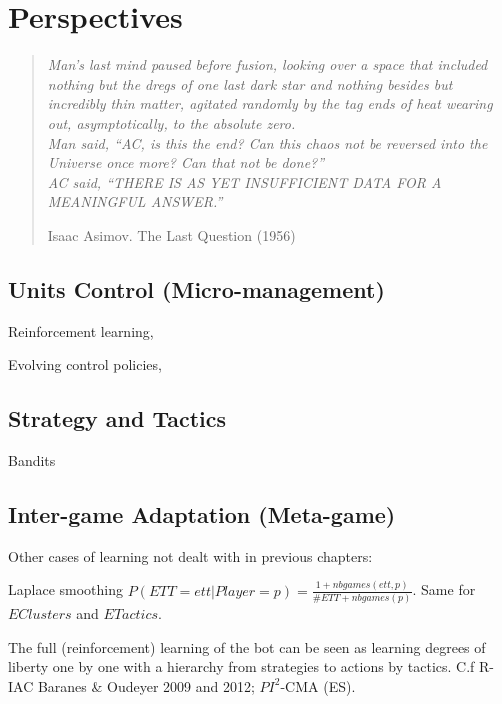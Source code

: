 \chapter{Perspectives}
\chaptertoc

\begin{quotation}\textit{
Man's last mind paused before fusion, looking over a space that included nothing but the dregs of one last dark star and nothing besides but incredibly thin matter, agitated randomly by the tag ends of heat wearing out, asymptotically, to the absolute zero.\\
Man said, ``AC, is this the end? Can this chaos not be reversed into the Universe once more? Can that not be done?''\\
AC said, ``THERE IS AS YET INSUFFICIENT DATA FOR A MEANINGFUL ANSWER.''
}
\begin{flushright}Isaac Asimov. The Last Question (1956)\end{flushright}\end{quotation}

\section{Units Control (Micro-management)}
Reinforcement learning, \citep{Marthi05concurrenthierarchical}


Evolving control policies, \citep{Miles2007}

\section{Strategy and Tactics}

Bandits

\section{Inter-game Adaptation (Meta-game)}
Other cases of learning not dealt with in previous chapters:
\citep{metalevelbehavioradaptrts}


Laplace smoothing $P(ETT=ett|Player=p)= \frac{1 + nbgames(ett,p)}{\#ETT + nbgames(p)}$. Same for $EClusters$ and $ETactics$.


The full (reinforcement) learning of the bot can be seen as learning degrees of liberty one by one with a hierarchy from strategies to actions by tactics. C.f R-IAC Baranes \& Oudeyer 2009 and 2012; $PI^2$-CMA (ES).


